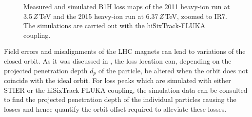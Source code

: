 \begin{figure}[p]
  \centering
  \caption{Measured and simulated B1H loss maps of the 2011 heavy-ion run at 3.5$\,Z\,$TeV and the 2015 heavy-ion run at 6.37$\,Z\,$TeV, zoomed to IR7. The simulations are carried out with the hiSixTrack-FLUKA coupling.}  
  \label{pic:16082902}
  \end{figure}


Field errors and misalignments of the LHC magnets can lead to variations of the closed orbit. As it was discussed in , the loss location can, depending on the projected penetration depth $d_p$ of the particle, be altered when the orbit does not coincide with the ideal orbit. For loss peaks which are simulated with either STIER or the hiSixTrack-FLUKA coupling, the simulation data can be consulted to find the projected penetration depth of the individual particles causing the losses and hence quantify the orbit offset required to alleviate these losses. 


